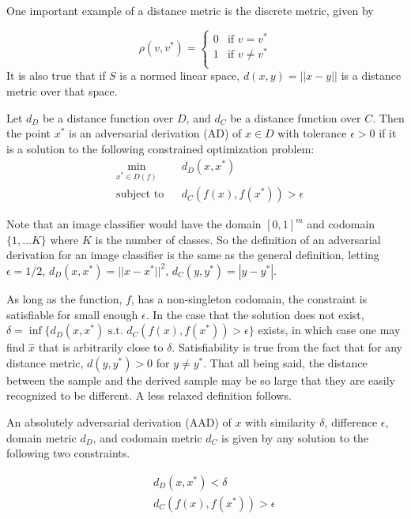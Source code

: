 \noindent One important example of a distance metric is the discrete metric, given by

\[
\rho(v,v^*) =
\begin{cases}
0 & \text{if $v = v^*$} \\
1 & \text{if $v \neq v^*$} \\
\end{cases}
\]
\noindent
It is also true that if $S$ is a normed linear space, $d(x,y) = ||x-y||$ is a distance metric over that space.

\begin{definition}
Let $d_D$ be a distance function over $D$, and $d_C$ be a distance function over $C$.  Then the point $x^*$ is an adversarial derivation (AD) of $x\in D$ with tolerance $\epsilon > 0$ if it is a solution to the following constrained optimization problem:
\begin{equation*}
\begin{aligned}
& \underset{x^*\in D(f)}{\text{min}}
& & d_D(x,x^*) \\
& \text{subject to}
& & d_C(f(x),f(x^*)) > \epsilon
\end{aligned}
\end{equation*}
\end{definition}

\noindent
Note that an image classifier would have the domain $[0,1]^m$ and codomain $ \{1,...K\} $ where $K$ is the number of classes.  So the definition of an adversarial derivation for an image classifier is the same as the general definition, letting $\epsilon = 1/2$, $d_D(x,x^*) = ||x-x^*||^2$, $d_C(y,y^*) = |y-y^*|$.

As long as the function, $f$, has a non-singleton codomain, the constraint is satisfiable for small enough $\epsilon$.  In the case that the solution does not exist, $\delta = \inf \{d_D(x,x^*) \text{ s.t. } d_C(f(x),f(x^*)) > \epsilon\}$ exists, in which case one may find $\hat{x}$ that is arbitrarily close to $\delta$.  Satisfiability is true from the fact that for any distance metric, $d(y,y^*) > 0$ for $y \neq y^*$.  That all being said, the distance between the sample and the derived sample may be so large that they are easily recognized to be different.  A less relaxed definition follows.

\begin{definition}
An absolutely adversarial derivation (AAD) of $x$ with similarity $\delta$, difference $\epsilon$, domain metric $d_D$, and codomain metric $d_C$ is given by any solution to the following two constraints.

\begin{equation*}
\begin{aligned}
& & d_D(x,x^*) < \delta\\
& & d_C(f(x),f(x^*)) > \epsilon
\end{aligned}
\end{equation*}
\end{definition}

